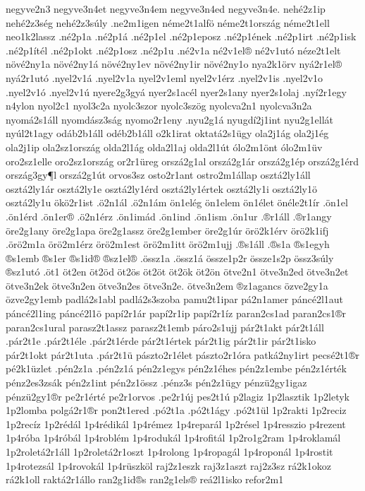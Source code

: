{negyve2n3
negyve3n4et
negyve3n4em
negyve3n4ed
negyve3n4e.
nehé2z1ip
nehé2z3ség
nehé2z3súly
.ne2m1igen
néme2t1alfö
néme2t1ország
néme2t1ell
neo1k2lassz
.né2p1a
.né2p1á
.né2p1el
.né2p1eposz
.né2p1ének
.né2p1irt
.né2p1isk
.né2p1ítél
.né2p1okt
.né2p1osz
.né2p1u
.né2v1a
né2v1el®
né2v1utó
néze2t1elt
növé2ny1a
növé2ny1á
növé2ny1ev
növé2ny1ir
növé2ny1o
nya2k1örv
nyá2r1el®
nyá2r1utó
.nyel2v1á
.nyel2v1a
nyel2v1eml
nyel2v1érz
.nyel2v1is
.nyel2v1o
.nyel2v1ó
.nyel2v1ú
nyere2g3gyá
nyer2s1acél
nyer2s1any
nyer2s1olaj
.nyí2r1egy %
n4ylon
nyol2c1
nyol3c2a
nyolc3szor
nyolc3szög
nyolcva2n1
nyolcva3n2a
nyomá2s1áll
nyomdász3ság
nyomo2r1eny
.nyu2g1á
nyugdí2j1int
nyu2g1ellát
nyúl2t1agy
odáb2b1áll
odéb2b1áll
o2k1irat
oktatá2s1ügy
ola2j1ág
ola2j1ég
ola2j1ip
ola2sz1ország
olda2l1ág
olda2l1aj
olda2l1út
ólo2m1önt
ólo2m1üv
oro2sz1elle
oro2sz1ország
or2r1üreg
orszá2g1al
orszá2g1ár
orszá2g1ép
orszá2g1érd
ország3gy¶l
orszá2g1út
orvos3sz
osto2r1ant
ostro2m1állap
osztá2ly1áll
osztá2ly1ár
osztá2ly1e
osztá2ly1érd
osztá2ly1értek
osztá2ly1i
osztá2ly1ö
osztá2ly1u
ökö2r1ist
.ö2n1ál
.ö2n1ám
ön1elég
ön1elem
ön1élet
önéle2t1ír
.ön1el
.ön1érd
.ön1er®
.ö2n1érz
.ön1imád
.ön1ind
.ön1ism
.ön1ur
.®r1áll
.®r1angy
öre2g1any
öre2g1apa
öre2g1assz
öre2g1ember
öre2g1úr
örö2k1érv
örö2k1ifj
.örö2m1a
örö2m1érz
örö2m1est
örö2m1itt
örö2m1ujj
.®s1áll
.®s1a
®s1egyh
®s1emb
®s1er
®s1id®
®sz1el®
.össz1a
.össz1á
össze1p2r
össze1s2p
össz3súly
®sz1utó
.öt1
öt2en
öt2öd
öt2ös
öt2öt
öt2ök
öt2ön
ötve2n1
ötve3n2ed
ötve3n2et
ötve3n2ek
ötve3n2en
ötve3n2es
ötve3n2e.
ötve3n2em
®z1agancs
özve2gy1a
özve2gy1emb
padlá2s1abl
padlá2s3szoba
pamu2t1ipar
pá2n1amer
páncé2l1aut
páncé2l1ing
páncé2l1ö
papí2r1ár
papí2r1ip
papí2r1íz
paran2cs1ad
paran2cs1®r
paran2cs1ural
parasz2t1assz
parasz2t1emb
páro2s1ujj
pár2t1akt
pár2t1áll
.pár2t1e
.pár2t1éle
.pár2t1érde
pár2t1értek
pár2t1ig
pár2t1ir         %
pár2t1isko
pár2t1okt
pár2t1uta
.pár2t1ü
pászto2r1élet
pászto2r1óra
patká2ny1irt
pecsé2t1®r
pé2k1üzlet
.pén2z1a
.pén2z1á
pén2z1egys
pén2z1éhes
pén2z1embe
pén2z1érték
pénz2es3zsák
pén2z1int
pén2z1össz
.pénz3s
pén2z1ügy
pénzü2gy1igaz
pénzü2gy1®r
pe2r1érté
pe2r1orvos
.pe2r1új
pes2t1ú
p2lagiz
1p2lasztik
1p2letyk
1p2lomba
polgá2r1®r
pon2t1ered
.pó2t1a
.pó2t1ágy
.pó2t1ül
1p2rakti
1p2reciz
1p2recíz
1p2rédál
1p4rédikál
1p4rémez
1p4reparál
1p2résel
1p4resszio
p4rezent
1p4róba
1p4róbál
1p4roblém
1p4rodukál
1p4rofitál
1p2ro1g2ram
1p4roklamál
1p2roletá2r1áll
1p2roletá2r1oszt
1p4rolong
1p4ropagál
1p4roponál
1p4rostit
1p4rotezsál
1p4rovokál
1p4rüszköl
raj2z1eszk
raj3z1aszt
raj2z3sz
rá2k1okoz
rá2k1oll
raktá2r1állo
ran2g1id®s
ran2g1els®
reá2l1isko
refor2m1 %
}

